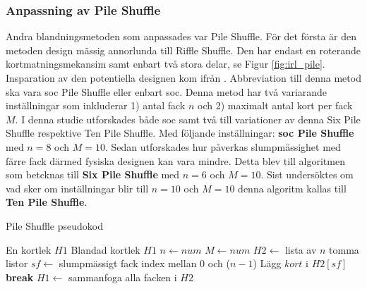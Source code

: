 \documentclass[swedish,a4paper]{article}
\begin{document}


\subsubsection{Anpassning av Pile Shuffle}
Andra blandningsmetoden som anpassades var Pile Shuffle.
För det första är den metoden design mässig 
annorlunda till Riffle Shuffle. Den har endast en roterande
kortmatningsmekansim samt enbart två stora delar, se Figur
\ref{fig:irl_pile}. Insparation av den potentiella designen 
kom ifrån
\textcite{3DprintedLife2021}. Abbreviation till denna  metod 
ska vara \gls{soc} Pile Shuffle eller enbart 
\gls{soc}. Denna metod har två variarande inställningar som 
inkluderar 1) antal fack $n$ och 2) maximalt antal kort per
fack $M$. I denna studie utforskades både \gls{soc} samt 
två till variationer av denna Six Pile Shuffle respektive 
Ten Pile Shuffle. Med följande inställningar:
\textbf{\gls{soc} Pile Shuffle} med $n = 8$ och $M = 10$. Sedan utforskades hur påverkas slumpmässighet med färre fack
därmed fysiska designen kan vara mindre. Detta blev till 
algoritmen som betcknas till 
\textbf{Six Pile Shuffle} med $n = 6$ och $M = 10$. Sist undersöktes om vad sker om inställningar blir till $n = 10$ och $M = 10$ denna algoritm kallas till
\textbf{Ten Pile Shuffle}.

\begin{algorithm}
\caption{Pile Shuffle pseudokod}
\label{alg:pile}
\begin{algorithmic}[1]
\Require En kortlek $H1$
\Ensure Blandad kortlek $H1$ 
\State $n \gets num$ 
\State $M \gets num $ 
\State $H2 \gets$ lista av $n$ tomma listor %
    \Loop
        \State $sf \gets$ slumpmässigt fack index mellan $0$ och ($n-1$) 
            \State Lägg $kort$ i $H2[sf]$
            \State \textbf{break}
        \EndIf
    \EndLoop
\EndFor
\State $H1 \gets$ sammanfoga alla facken i $H2$ 
\end{algorithmic}
\end{algorithm}
\end{document}
